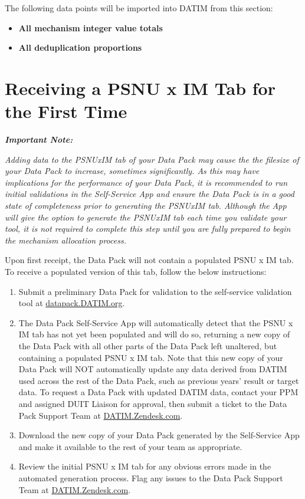 \documentclass[
  openany]{book}
\begin{document}
The following data points will be imported into DATIM from this section:

\begin{itemize}
\item
  \textbf{All mechanism integer value totals}
\item
  \textbf{All deduplication proportions}
\end{itemize}

\hypertarget{receiving-a-psnu-x-im-tab-for-the-first-time}{%
\section{Receiving a PSNU x IM Tab for the First Time}\label{receiving-a-psnu-x-im-tab-for-the-first-time}}

\textbf{\emph{Important Note:}}

\emph{Adding data to the PSNUxIM tab of your Data Pack may cause the the filesize of }
\emph{your Data Pack to increase, sometimes significantly. As this may have }
\emph{implications for the performance of your Data Pack, it is recommended to run }
\emph{initial validations in the Self-Service App and ensure the Data Pack is in a }
\emph{good state of completeness prior to generating the PSNUxIM tab. Although the }
\emph{App will give the option to generate the PSNUxIM tab each time you validate }
\emph{your tool, it is not required to complete this step until you are fully }
\emph{prepared to begin the mechanism allocation process.}

Upon first receipt, the Data Pack will not contain a populated PSNU x IM
tab. To receive a populated version of this tab, follow the below
instructions:

\begin{enumerate}
\def\labelenumi{\arabic{enumi})}
\item
  Submit a preliminary Data Pack for validation to the self-service
  validation tool at \href{http://datapack.datim.org/}{datapack.DATIM.org}.
\item
  The Data Pack Self-Service App will automatically detect that the
  PSNU x IM tab has not yet been populated and will do so, returning a
  new copy of the Data Pack with all other parts of the Data Pack left
  unaltered, but containing a populated PSNU x IM tab. Note that this
  new copy of your Data Pack will NOT automatically update any data
  derived from DATIM used across the rest of the Data Pack, such as
  previous years' result or target data. To request a Data Pack with
  updated DATIM data, contact your PPM and assigned DUIT Liaison for
  approval, then submit a ticket to the Data Pack Support Team at
  \href{http://datim.zendesk.com/}{DATIM.Zendesk.com}.
\item
  Download the new copy of your Data Pack generated by the
  Self-Service App and make it available to the rest of your team as
  appropriate.
\item
  Review the initial PSNU x IM tab for any obvious errors made in the
  automated generation process. Flag any issues to the Data Pack
  Support Team at \href{http://datim.zendesk.com/}{DATIM.Zendesk.com}.
\end{enumerate}
\end{document}
